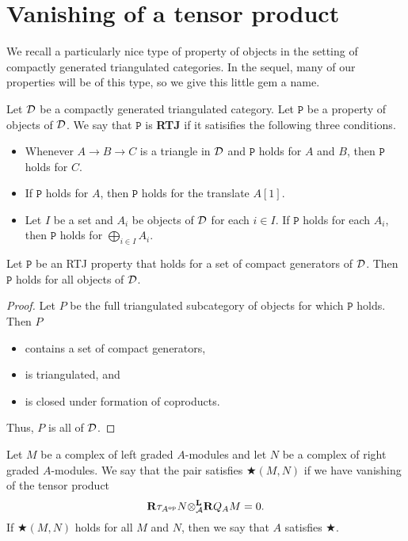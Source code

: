 \section{Vanishing of a tensor product} \label{subsection: vanishing of tensor}

We recall a particularly nice type of property of objects in the setting of compactly generated triangulated categories.
In the sequel, many of our properties will be of this type, so we give this little gem a name.

\begin{definition} \label{definition: run the jewels}
  Let \(\mathcal{D}\) be a compactly generated triangulated category.
  Let \(\mathtt{P}\) be a property of objects of \(\mathcal{D}\). 
  We say that \(\mathtt{P}\) is \textbf{RTJ} if it satisifies the following three conditions.
  \begin{itemize}
  \item Whenever \(A \to B \to C\) is a triangle in \(\mathcal{D}\) and \(\mathtt{P}\) holds for \(A\) and \(B\), then \(\mathtt{P}\) holds for \(C\). 
  \item If \(\mathtt{P}\) holds for \(A\), then \(\mathtt{P}\) holds for the translate \(A[1]\).
  \item Let \(I\) be a set and \(A_i\) be objects of \(\mathcal{D}\) for each \(i \in I\). If \(\mathtt{P}\) holds for each \(A_i\), then \(\mathtt{P}\) holds for \(\bigoplus_{i \in I} A_i\). 
  \end{itemize}
\end{definition}

\begin{proposition} \label{proposition: RTJ properties}
  Let \(\mathtt{P}\) be an RTJ property that holds for a set of compact generators of \(\mathcal{D}\). Then \(\mathtt{P}\) holds for all objects of \(\mathcal{D}\).
\end{proposition}

\begin{proof}
  Let \(P\) be the full triangulated subcategory of objects for which \(\mathtt{P}\) holds. Then \(P\)
  \begin{itemize}
  \item contains a set of compact generators,
  \item is triangulated, and
  \item is closed under formation of coproducts. 
  \end{itemize}
  Thus, \(P\) is all of \(\mathcal{D}\). 
\end{proof}


\begin{definition} \label{definition: tensor vanishing}
  Let \(M\) be a complex of left graded \(A\)-modules and let \(N\) be a complex of right graded \(A\)-modules. We say that the pair satisfies \(\bigstar(M,N)\) if we have vanishing of the tensor product
  \begin{displaymath}
    \mathbf{R} \tau_{A^{\operatorname{op}}} N {\otimes}^{\mathbf{L}}_{\mathcal A} \mathbf{R} Q_A M = 0.
  \end{displaymath}
  If \(\bigstar(M,N)\) holds for all \(M\) and \(N\), then we say that \(A\) satisfies \(\bigstar\). 
\end{definition}

